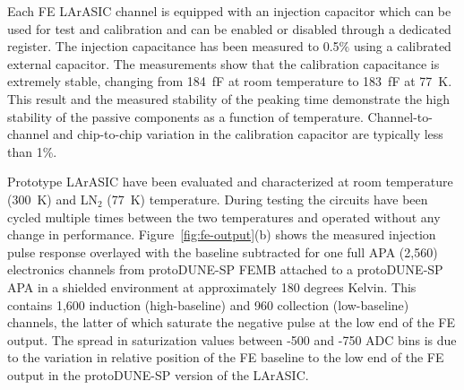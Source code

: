 Each FE LArASIC channel is equipped with an injection capacitor which can be used
for test and calibration and can be enabled or disabled through a
dedicated register. The injection capacitance has been measured to 0.5$\%$ using 
a calibrated external capacitor. The measurements show
that the calibration capacitance is extremely stable, changing from
184~fF at room temperature to 183~fF at 77~K. This result and the measured
stability of the peaking time demonstrate the high stability of the
passive components as a function of temperature. Channel-to-channel and chip-to-chip
variation in the calibration capacitor are typically less than 1\%. 

Prototype LArASIC have been evaluated and characterized at room temperature (300~K) and LN$_2$
(77~K) temperature.
During testing the circuits have been cycled multiple times
between the two temperatures and operated without any change in performance.
Figure~\ref{fig:fe-output}(b) shows the measured injection pulse response overlayed with the baseline subtracted for one full APA 
(2,560) electronics channels from protoDUNE-SP FEMB attached to a protoDUNE-SP APA in a 
shielded environment at approximately 180 degrees Kelvin. This contains 1,600 induction (high-baseline)
and 960 collection (low-baseline) channels, the latter of which saturate the negative pulse at the low 
end of the FE output. The spread in saturization values between -500 and -750 ADC bins is due to the
variation in relative position of the FE baseline to the low end of the FE output 
in the protoDUNE-SP version of the LArASIC.



